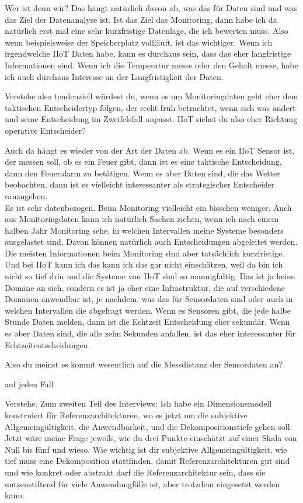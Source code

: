 \PA	 Wer ist denn wir? Das hängt natürlich davon ab, was das für Daten sind und was das Ziel der Datenanalyse ist. Ist das Ziel das Monitoring, dann habe ich da natürlich erst mal eine sehr kurzfristige Datenlage, die ich bewerten muss. Also wenn beispielsweise der Speicherplatz vollläuft, ist das wichtiger. Wenn ich irgendwelche \ac{IIoT} Daten habe, kann es durchaus sein, dass das eher langfristige Informationen sind. Wenn ich die Temperatur messe oder den \coo{} Gehalt messe, habe ich auch durchaus Interesse an der Langfristigkeit der Daten.

\LF	 Verstehe also tendenziell würdest du, wenn es um Monitoringdaten geht eher dem taktischen Entscheidertyp folgen, der recht früh betrachtet, wenn sich was ändert und seine Entscheidung im Zweifelsfall anpasst. \ac{IIoT} siehst du also eher Richtung operative Entscheider?

\PA	Auch da hängt es wieder von der Art der Daten ab. Wenn es ein \ac{IIoT} Sensor ist, der messen soll, ob es ein Feuer gibt, dann ist es eine taktische Entscheidung, dann den Feueralarm zu betätigen. Wenn es aber Daten sind, die das Wetter beobachten, dann ist es vielleicht interessanter als strategischer Entscheider ranzugehen. \\
Es ist sehr datenbezogen. Beim Monitoring vielleicht ein bisschen weniger. Auch aus Monitoringdaten kann ich natürlich Sachen ziehen, wenn ich nach einem halben Jahr Monitoring sehe, in welchen Intervallen meine Systeme besonders ausgelastet sind. Davon können natürlich auch Entscheidungen abgeleitet werden. Die meisten Informationen beim Monitoring sind aber tatsächlich kurzfristige. Und bei \ac{IIoT} kann ich das kann ich das gar nicht einschätzen, weil da bin ich nicht so tief drin und die Systeme von \ac{IIoT} sind so mannigfaltig. Das ist ja keine Domäne an sich, sondern es ist ja eher eine Infrastruktur, die auf verschiedene Domänen anwendbar ist, je nachdem, was das für Sensordaten sind oder auch in welchen Intervallen die abgefragt werden. Wenn es Sensoren gibt, die jede halbe Stunde Daten melden, dann ist die Echtzeit Entscheidung eher sekundär. Wenn es aber Daten sind, die alle zehn Sekunden anfallen, ist das eher interessanter für Echtzeitentscheidungen.

\LF	 Also du meinst es kommt wesentlich auf die Messdistanz der Sensordaten an?

\PA	 auf jeden Fall

\LF	 Verstehe. Zum zweiten Teil des Interviews: Ich habe ein Dimensionsmodell konstruiert für Referenzarchitekturen, wo es jetzt um die subjektive Allgemeingültigkeit, die Anwendbarkeit, und die Dekompositionstiefe gehen soll. Jetzt wäre meine Frage jeweils, wie du drei Punkte einschätzt auf einer Skala von Null bis fünf und wieso. Wie wichtig ist dir subjektive Allgemeingültigkeit, wie tief muss eine Dekomposition stattfinden, damit Referenzarchitekturen gut sind und wie konkret oder abstrakt darf die Referenzarchitektur sein, dass sie nutzenstiftend für viele Anwendungfälle ist, aber trotzdem eingesetzt werden kann.

